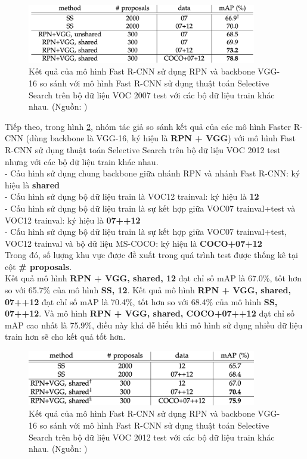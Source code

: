 {    \begin{figure}[H]
        \centering
        \includegraphics[width=10cm] {images/faster_rcnn_results_2}
        \caption{Kết quả của mô hình Fast R-CNN sử dụng RPN và backbone VGG-16 so sánh với mô hình Fast R-CNN sử dụng thuật toán Selective Search trên bộ dữ liệu VOC 2007 test với các bộ dữ liệu train khác nhau. (Nguồn: \cite{ren2015faster})}
        \label{fig:faster_rcnn_results_2}
    \end{figure}

    \noindent
    Tiếp theo, trong hình \ref{fig:faster_rcnn_results_3}, nhóm tác giả so sánh kết quả của các mô hình Faster R-CNN (dùng backbone là VGG-16, ký hiệu là \textbf{RPN + VGG}) với mô hình Fast R-CNN sử dụng thuật toán Selective Search trên bộ dữ liệu VOC 2012 test nhưng với các bộ dữ liệu train khác nhau. \\
    - Cấu hình sử dụng chung backbone giữa nhánh RPN và nhánh Fast R-CNN: ký hiệu là \textbf{shared} \\
    - Cấu hình sử dụng bộ dữ liệu train là VOC12 trainval: ký hiệu là \textbf{12} \\
    - Cấu hình sử dụng bộ dữ liệu train là sự kết hợp giữa VOC07 trainval+test và VOC12 trainval: ký hiệu là \textbf{07++12} \\
    - Cấu hình sử dụng bộ dữ liệu train là sự kết hợp giữa VOC07 trainval+test, VOC12 trainval và bộ dữ liệu MS-COCO: ký hiệu là \textbf{COCO+07+12} \\
    Trong đó, số lượng khu vực được đề xuất trong quá trình test được thống kê tại cột \textbf{\# proposals}. \\
    Kết quả mô hình \textbf{RPN + VGG, shared, 12} đạt chỉ số mAP là 67.0\%, tốt hơn so với 65.7\% của mô hình \textbf{SS, 12}.
    Kết quả mô hình \textbf{RPN + VGG, shared, 07++12} đạt chỉ số mAP là 70.4\%, tốt hơn so với 68.4\% của mô hình \textbf{SS, 07++12}.
    Và mô hình \textbf{RPN + VGG, shared, COCO+07++12} đạt chỉ số mAP cao nhất là 75.9\%, điều này khá dễ hiểu khi mô hình sử dụng nhiều dữ liệu train hơn sẽ cho kết quả tốt hơn.

    \begin{figure}[H]
        \centering
        \includegraphics[width=10cm] {images/faster_rcnn_results_3}
        \caption{Kết quả của mô hình Fast R-CNN sử dụng RPN và backbone VGG-16 so sánh với mô hình Fast R-CNN sử dụng thuật toán Selective Search trên bộ dữ liệu VOC 2012 test với các bộ dữ liệu train khác nhau. (Nguồn: \cite{ren2015faster})}
        \label{fig:faster_rcnn_results_3}
    \end{figure}

}
